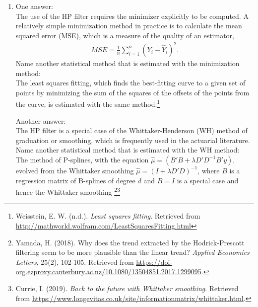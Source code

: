 \documentclass[10pt]{article}
\begin{document}
\begin{enumerate}[1)]
\item
One answer:\\
The use of the HP filter requires the minimizer explicitly to be computed. A relatively simple minimization method in practice is to calculate the mean squared error (MSE), which is a measure of the quality of an estimator,
\begin{align*}
MSE=\frac{1}{n}\sum_{i=1}^{n}(Y_i-\hat{Y}_i)^2. %
\end{align*}
Name another statistical method that is estimated with the minimization method:\\
The least squares fitting, which finds the best-fitting curve to a given set of points by minimizing the sum of the squares of the offsets of the points from the curve, is estimated with the same method.\footnote{ Weisstein, E. W. (n.d.). \textit{Least squares fitting}. Retrieved from \url{http://mathworld.wolfram.com/LeastSquaresFitting.html}}

Another answer:\\
The HP filter is a special case of the Whittaker-Henderson (WH) method of graduation or smoothing, which is frequently used in the actuarial literature.\\
Name another statistical method that is estimated with the WH method:\\
The method of P-splines, with the equation $\hat{\mu}=(B'B+\lambda{D'}D^{-1}B'y)$, evolved from the Whittaker smoothing $\hat{\mu}=(I+\lambda{D'}D)^{-1}$, where $B$ is a regression matrix of B-splines of degree $d$ and $B=I$ is a special case and hence the Whittaker smoothing
\footnote{ Yamada, H. (2018). Why does the trend extracted by the Hodrick-Prescott filtering seem to be more plausible than the linear trend? \textit{Applied Economics Letters}, 25(2), 102-105. Retrieved from \url{https://doi-org.ezproxy.canterbury.ac.nz/10.1080/13504851.2017.1299095}.}\footnote{ Currie, I. (2019). \textit{Back to the future with Whittaker smoothing}. Retrieved from \url{https://www.longevitas.co.uk/site/informationmatrix/whittaker.html}.}
\vspace{3mm}


\end{enumerate}
\end{document}
